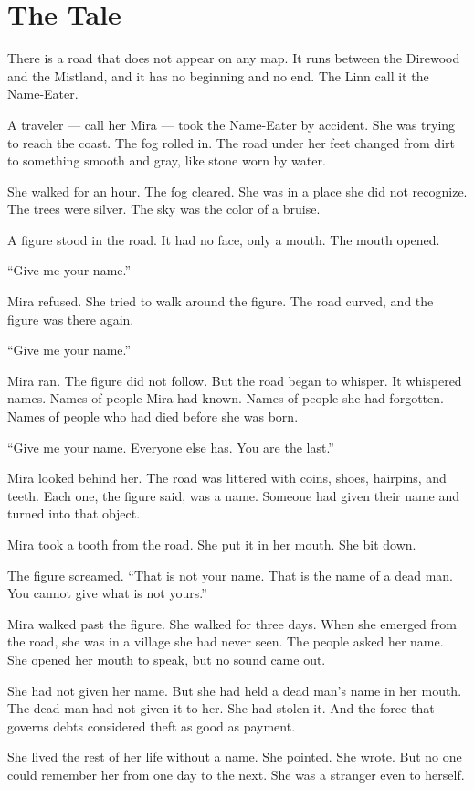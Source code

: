 \documentclass[10pt,twoside]{book}
\begin{document}
\section*{The Tale}
There is a road that does not appear on any map. It runs between the Direwood and the Mistland, and it has no beginning and no end. The Linn call it the Name-Eater.

A traveler --- call her Mira --- took the Name-Eater by accident. She was trying to reach the coast. The fog rolled in. The road under her feet changed from dirt to something smooth and gray, like stone worn by water.

She walked for an hour. The fog cleared. She was in a place she did not recognize. The trees were silver. The sky was the color of a bruise.

A figure stood in the road. It had no face, only a mouth. The mouth opened.

``Give me your name.''

Mira refused. She tried to walk around the figure. The road curved, and the figure was there again.

``Give me your name.''

Mira ran. The figure did not follow. But the road began to whisper. It whispered names. Names of people Mira had known. Names of people she had forgotten. Names of people who had died before she was born.

``Give me your name. Everyone else has. You are the last.''

Mira looked behind her. The road was littered with coins, shoes, hairpins, and teeth. Each one, the figure said, was a name. Someone had given their name and turned into that object.

Mira took a tooth from the road. She put it in her mouth. She bit down.

The figure screamed. ``That is not your name. That is the name of a dead man. You cannot give what is not yours.''

Mira walked past the figure. She walked for three days. When she emerged from the road, she was in a village she had never seen. The people asked her name. She opened her mouth to speak, but no sound came out.

She had not given her name. But she had held a dead man's name in her mouth. The dead man had not given it to her. She had stolen it. And the force that governs debts considered theft as good as payment.

She lived the rest of her life without a name. She pointed. She wrote. But no one could remember her from one day to the next. She was a stranger even to herself.
\end{document}
